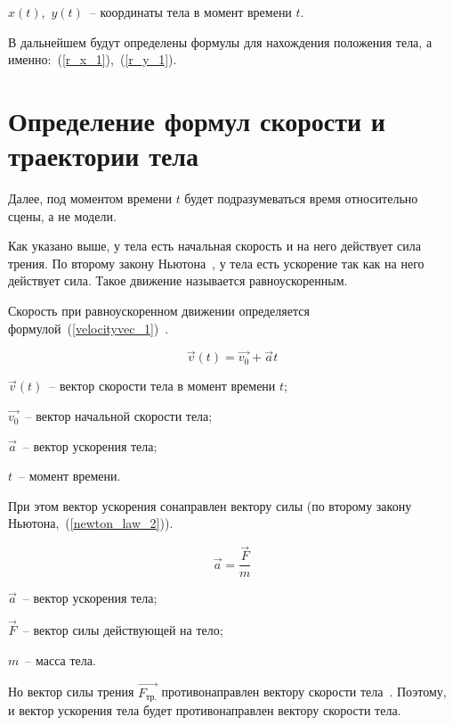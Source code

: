 \begin{Underequation}
  \(x(t)\),~\(y(t)\)~-- координаты тела в момент времени \(t\).
\end{Underequation}

В дальнейшем будут определены формулы для нахождения положения тела, а именно:~(\ref{r_x_1}),~(\ref{r_y_1}).

\section{Определение формул скорости и траектории тела}

Далее, под моментом времени \(t\) будет подразумеваться время относительно сцены, а не модели.

Как указано выше, у тела есть начальная скорость и на него действует сила трения.
По второму закону Ньютона~\cite[с.~114]{rowellherbert}, у тела есть ускорение так как на него действует сила.
Такое движение называется равноускоренным.

Скорость при равноускоренном движении определяется формулой~(\ref{velocityvec_1})~\cite[с.~96]{rowellherbert}.

\begin{equation}\label{velocityvec_1}
  \vec{v}(t) = \vec{v_0} + \vec{a}t
\end{equation}

\begin{Underequation}
  \(\vec{v}(t)\)~-- вектор скорости тела в момент времени \(t\);

  \(\vec{v_0}\)~-- вектор начальной скорости тела;

  \(\vec{a}\)~-- вектор ускорения тела;

  \(t\)~-- момент времени.
\end{Underequation}

При этом вектор ускорения сонаправлен вектору силы (по второму закону Ньютона,~(\ref{newton_law_2})).

\begin{equation}\label{newton_law_2}
  \vec{a} = \frac{\vec{F}}{m}
\end{equation}

\begin{Underequation}
  \(\vec{a}\)~-- вектор ускорения тела;

  \(\vec{F}\)~-- вектор силы действующей на тело;

  \(m\)~-- масса тела.
\end{Underequation}

Но вектор силы трения \(\vec{F_{\text{тр.}}}\) противонаправлен вектору скорости тела~\cite[с.~21]{rowellherbert}.
Поэтому, и вектор ускорения тела будет противонаправлен вектору скорости тела.

